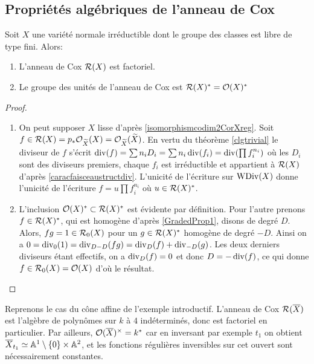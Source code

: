 \subsection{Propriétés algébriques de l'anneau de Cox}

\begin{thm}\label{coxFreeFactoriel}
Soit $X$ une variété normale irréductible dont le groupe des classes est libre de type fini. Alors:
\begin{enumerate}
\item L'anneau de Cox $\mathcal{R}(X)$ est factoriel.
\item Le groupe des unités de l'anneau de Cox est $\mathcal{R}(X)^*=\mathcal{O}(X)^*$
\end{enumerate}
\end{thm}
\begin{proof}
\begin{enumerate}
\item On peut supposer $X$ lisse d'après \ref{isomorphismcodim2CorXreg}. Soit $f\in \mathcal{R}(X)=p_*\mathcal{O}_{\widetilde{X}}(X)=\mathcal{O}_{\widetilde{X}}(\widetilde{X})$. En vertu du théorème \ref{clgtrivial} le diviseur de $f$ s'écrit $\operatorname{div}(f)= \sum n_iD_i=\sum n_i\operatorname{div}(f_i)=\operatorname{div}(\prod f_i^{n_i})$ où les $D_i$ sont des diviseurs premiers, chaque $f_i$ est irréductible et appartient à $\mathcal{R}(X)$ d'après \ref{caracfaisceaustructdiv}. L'unicité de l'écriture sur $\operatorname{WDiv}(X)$ donne l'unicité de l'écriture $f=u\prod f_i^{n_i}$ où $u\in \mathcal{R}(X)^*$.
\item L'inclusion $\mathcal{O}(X)^*\subset\mathcal{R}(X)^*$ est évidente par définition. Pour l'autre prenons $f\in\mathcal{R}(X)^*$, qui est homogène d'après \ref{GradedProp1}, disons de degré $D$. Alors, $fg=1\in \mathcal{R}_0(X)$ pour un $g\in\mathcal{R}(X)^*$ homogène de degré $-D$. Ainsi on a $0=\operatorname{div}_0(1)=\operatorname{div}_{D-D}(fg)=\operatorname{div}_D(f)+\operatorname{div}_{-D}(g)$. Les deux derniers diviseurs étant effectifs, on a $\operatorname{div}_D(f)=0$ et donc $D=-\operatorname{div}(f)$, ce qui donne $f\in\mathcal{R}_0(X)=\mathcal{O}(X)$ d'où le résultat.
\end{enumerate}
\end{proof}

\begin{ex}
Reprenons le cas du cône affine de l'exemple introductif.  L'anneau de Cox $\mathcal{R}(\overline{X})$ est l'algèbre de polynômes sur $k$ à $4$ indéterminés, donc est factoriel en particulier.  Par ailleurs, $\mathcal{O}(\overline{X})^{\times}=k^*$ car en inversant par exemple $t_1$  on obtient $\overline{X}_{t_1}\simeq \mathbb{A}^{1}\setminus \lbrace0\rbrace\times\mathbb{A}^{2}$, et les fonctions régulières inversibles sur cet ouvert sont nécessairement constantes.
\end{ex}


